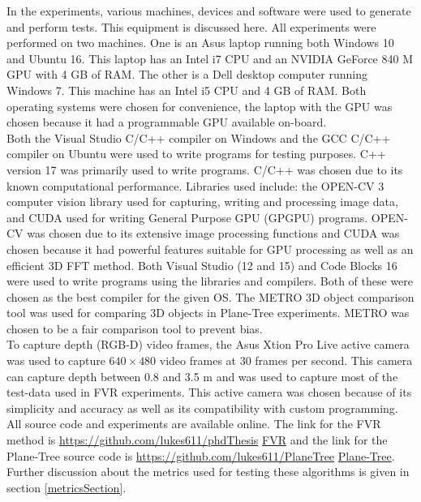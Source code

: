 
In the experiments, various machines, devices and software were used to generate and perform tests. This equipment is discussed here. All experiments were performed on two machines. One is an Asus laptop running both Windows 10 and Ubuntu 16. This laptop has an Intel i7 CPU and an NVIDIA GeForce 840 M GPU with 4 GB of RAM. The other is a Dell desktop computer running Windows 7. This machine has an Intel i5 CPU and 4 GB of RAM. Both operating systems were chosen for convenience, the laptop with the GPU was chosen because it had a programmable GPU available on-board. \\ 

Both the Visual Studio C/C++ compiler on Windows and the GCC C/C++ compiler on Ubuntu were used to write programs for testing purposes. C++ version 17 was primarily used to write programs. C/C++ was chosen due to its known computational performance. Libraries used include: the OPEN-CV 3 computer vision library used for capturing, writing and processing image data, and CUDA used for writing General Purpose GPU (GPGPU) programs. OPEN-CV was chosen due to its extensive image processing functions and CUDA was chosen because it had powerful features suitable for GPU processing as well as an efficient 3D FFT method. Both Visual Studio (12 and 15) and Code Blocks 16 were used to write programs using the libraries and compilers. Both of these were chosen as the best compiler for the given OS. The METRO 3D object comparison tool was used for comparing 3D objects in Plane-Tree experiments. METRO was chosen to be a fair comparison tool to prevent bias. \\

To capture depth (RGB-D) video frames, the Asus Xtion Pro Live active camera was used to capture $640\times480$ video frames at 30 frames per second. This camera can capture depth between 0.8 and 3.5 m and was used to capture most of the test-data used in FVR experiments. This active camera was chosen because of its simplicity and accuracy as well as its compatibility with custom programming. \\ 

All source code and experiments are available online. The link for the FVR method is \url{https://github.com/lukes611/phdThesis} \href{https://github.com/lukes611/phdThesis} {FVR} and the link for the Plane-Tree source code is \url{https://github.com/lukes611/PlaneTree} \href{https://github.com/lukes611/PlaneTree}{Plane-Tree}. Further discussion about the metrics used for testing these algorithms is given in section \ref{metricsSection}. \\  

